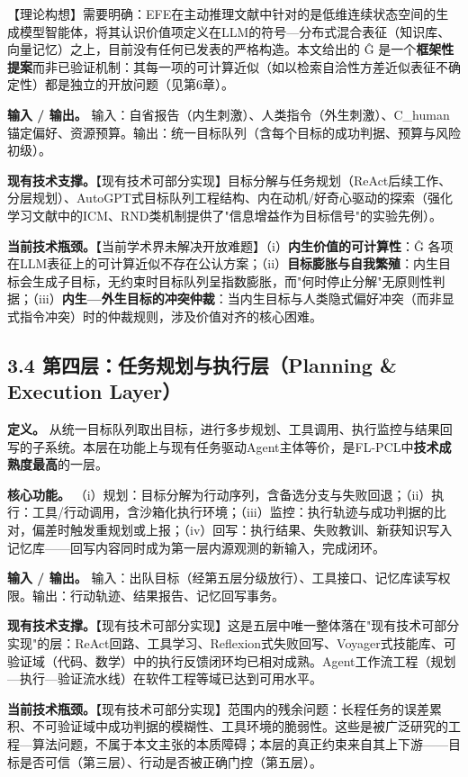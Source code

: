 \documentclass[11pt,a4paper]{ctexart}
\begin{document}
【理论构想】需要明确：EFE在主动推理文献中针对的是低维连续状态空间的生成模型智能体，将其认识价值项定义在LLM的符号—分布式混合表征（知识库、向量记忆）之上，目前没有任何已发表的严格构造。本文给出的 Ĝ 是一个\textbf{框架性提案}而非已验证机制：其每一项的可计算近似（如以检索自洽性方差近似表征不确定性）都是独立的开放问题（见第6章）。

\textbf{输入 / 输出。} 输入：自省报告（内生刺激）、人类指令（外生刺激）、C\_human 锚定偏好、资源预算。输出：统一目标队列（含每个目标的成功判据、预算与风险初级）。

\textbf{现有技术支撑。}【现有技术可部分实现】目标分解与任务规划（ReAct后续工作、分层规划）、AutoGPT式目标队列工程结构、内在动机/好奇心驱动的探索（强化学习文献中的ICM、RND类机制提供了"信息增益作为目标信号"的实验先例）。

\textbf{当前技术瓶颈。}【当前学术界未解决开放难题】（i）\textbf{内生价值的可计算性}：Ĝ 各项在LLM表征上的可计算近似不存在公认方案；（ii）\textbf{目标膨胀与自我繁殖}：内生目标会生成子目标，无约束时目标队列呈指数膨胀，而"何时停止分解"无原则性判据；（iii）\textbf{内生—外生目标的冲突仲裁}：当内生目标与人类隐式偏好冲突（而非显式指令冲突）时的仲裁规则，涉及价值对齐的核心困难。

\subsection{3.4 第四层：任务规划与执行层（Planning \& Execution Layer）}

\textbf{定义。} 从统一目标队列取出目标，进行多步规划、工具调用、执行监控与结果回写的子系统。本层在功能上与现有任务驱动Agent主体等价，是FL-PCL中\textbf{技术成熟度最高}的一层。

\textbf{核心功能。} （i）规划：目标分解为行动序列，含备选分支与失败回退；（ii）执行：工具/行动调用，含沙箱化执行环境；（iii）监控：执行轨迹与成功判据的比对，偏差时触发重规划或上报；（iv）回写：执行结果、失败教训、新获知识写入记忆库——回写内容同时成为第一层内源观测的新输入，完成闭环。

\textbf{输入 / 输出。} 输入：出队目标（经第五层分级放行）、工具接口、记忆库读写权限。输出：行动轨迹、结果报告、记忆回写事务。

\textbf{现有技术支撑。}【现有技术可部分实现】这是五层中唯一整体落在"现有技术可部分实现"的层：ReAct回路、工具学习、Reflexion式失败回写、Voyager式技能库、可验证域（代码、数学）中的执行反馈闭环均已相对成熟。Agent工作流工程（规划—执行—验证流水线）在软件工程等域已达到可用水平。

\textbf{当前技术瓶颈。}【现有技术可部分实现】范围内的残余问题：长程任务的误差累积、不可验证域中成功判据的模糊性、工具环境的脆弱性。这些是被广泛研究的工程—算法问题，不属于本文主张的本质障碍；本层的真正约束来自其上下游——目标是否可信（第三层）、行动是否被正确门控（第五层）。
\end{document}
